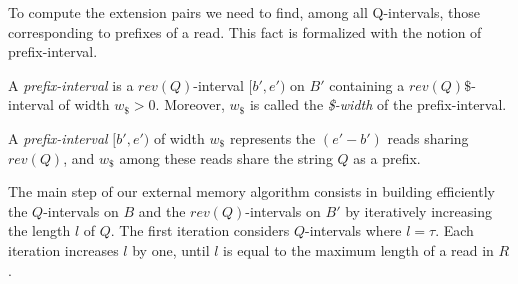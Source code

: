 \documentclass[runningheads,envcountsame,a4paper]{llncs}
\newcommand{\notaestesa}[2]{%
 \marginpar{\color{red!75!black}\textbf{\texttimes}}%
 {\color{red!75!black}%
 [\,\textbullet\,\textsf{\textbf{#1:}} %
 \textsf{\footnotesize#2}\,\textbullet\,]}%
}
\begin{document}


To compute the extension pairs we need to find, among all Q-intervals, those corresponding to prefixes of a read.
This fact is formalized with the notion of prefix-interval.

\begin{definition}
A \emph{prefix-interval} is a $rev(Q)$-interval $[b',e')$ on $B'$ containing
a $rev(Q)\$$-interval of width $w_{\$}>0$.
Moreover, $w_{\$}$ is called the \emph{\$-width}
of the prefix-interval.
\end{definition}

A \emph{prefix-interval} $[b',e')$ of width $w_{\$}$ represents the $(e'-b')$
reads sharing $rev(Q)$, and $w_{\$}$ among these reads share the string $Q$ as a
prefix.

The main step of our external memory algorithm consists in  building efficiently
the $Q$-intervals on $B$ and the $rev(Q)$-intervals on
$B'$ by iteratively increasing the length $l$ of $Q$.
The first iteration considers $Q$-intervals where $l=\tau$.
Each iteration increases $l$ by one, until $l$ is equal to the maximum length
of a read in $R$.
\end{document}
